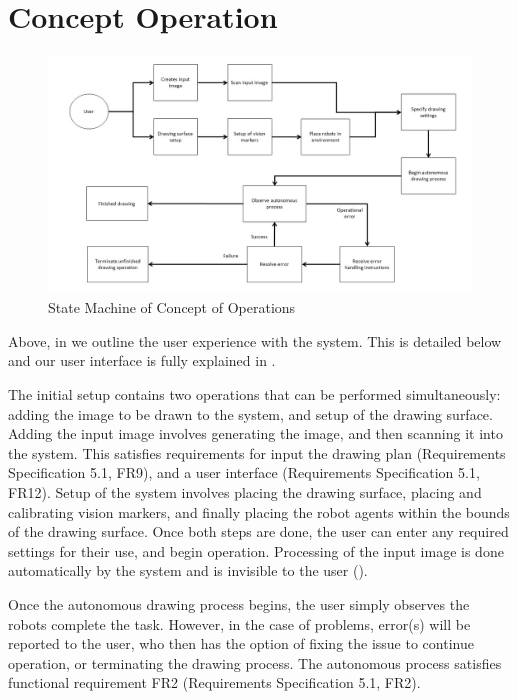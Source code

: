 
\pagebreak
\section{Concept Operation}
\label{sec:concept_operation}

\begin{figure}[h!]
 \centering
  \includegraphics[width=0.90\columnwidth]{diagrams/concept_operation_user.jpg}
	\caption{State Machine of Concept of Operations}
 \label{fig:concept_operation}
\end{figure}

Above, in  we outline the user experience with the system. This is detailed below and our user interface is fully explained in .

The initial setup contains two operations that can be performed simultaneously: adding the image to be drawn to the system, and setup of the drawing surface. Adding the input image involves generating the image, and then scanning it into the system. This satisfies requirements for input the drawing plan (Requirements Specification 5.1, FR9), and a user interface (Requirements Specification 5.1, FR12). Setup of the system involves placing the drawing surface, placing and calibrating vision markers, and finally placing the robot agents within the bounds of the drawing surface. Once both steps are done, the user can enter any required settings for their use, and begin operation. Processing of the input image is done automatically by the system and is invisible to the user ().

Once the autonomous drawing process begins, the user simply observes the robots complete the task. However, in the case of problems, error(s) will be reported to the user, who then has the option of fixing the issue to continue operation, or terminating the drawing process. The autonomous process satisfies functional requirement FR2 (Requirements Specification 5.1, FR2).
